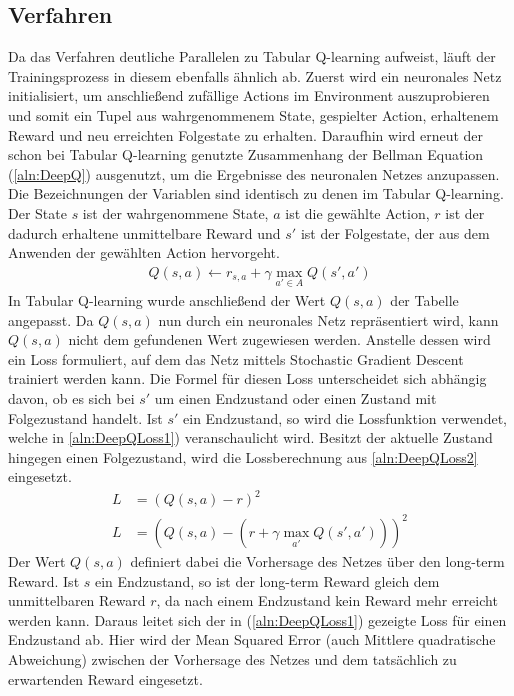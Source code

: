 \documentclass[11pt]{scrartcl}
\begin{document}
\subsection{Verfahren}
\label{sec:deepq-procedure}
Da das Verfahren deutliche Parallelen zu Tabular Q-learning aufweist, läuft der
Trainingsprozess in diesem ebenfalls ähnlich ab. Zuerst wird ein neuronales Netz
initialisiert, um anschließend zufällige Actions im Environment auszuprobieren
und somit ein Tupel aus wahrgenommenem State, gespielter Action, erhaltenem
Reward und neu erreichten Folgestate zu erhalten. Daraufhin wird erneut der schon
bei Tabular Q-learning genutzte Zusammenhang der Bellman Equation (\ref{aln:DeepQ})
ausgenutzt, um die Ergebnisse des neuronalen Netzes anzupassen. Die Bezeichnungen
der Variablen sind identisch zu denen im Tabular Q-learning. Der State $s$ ist der
wahrgenommene State, $a$ ist die gewählte Action, $r$ ist der dadurch erhaltene
unmittelbare Reward und $s'$ ist der Folgestate, der aus dem Anwenden der gewählten
Action hervorgeht.
\begin{align}
  Q(s, a) \leftarrow r_{s,a} + \gamma \max_{a' \in A}Q(s', a') \label{aln:DeepQ}
\end{align}
\noindent
In Tabular Q-learning wurde anschließend der Wert $Q(s, a)$ der Tabelle angepasst. Da 
$Q(s, a)$ nun durch ein neuronales Netz repräsentiert wird, kann $Q(s, a)$ nicht dem
gefundenen Wert zugewiesen werden. Anstelle dessen wird ein Loss formuliert, auf dem
das Netz mittels Stochastic Gradient Descent trainiert werden kann. Die Formel für
diesen Loss unterscheidet sich abhängig davon, ob es sich bei $s'$ um einen Endzustand
oder einen Zustand mit Folgezustand handelt. Ist $s'$ ein Endzustand, so wird die
Lossfunktion verwendet, welche in \autoref{aln:DeepQLoss1}) veranschaulicht wird.
Besitzt der aktuelle Zustand hingegen einen Folgezustand, wird die Lossberechnung
aus \autoref{aln:DeepQLoss2} eingesetzt.
\begin{align}
  L & = \left(Q(s, a) - r\right)^2 \label{aln:DeepQLoss1} \\
  L & = \left(Q(s, a) - \left(r + \gamma \max_{a'} Q(s', a')\right)\right)^2 \label{aln:DeepQLoss2}
\end{align}
\noindent
Der Wert $Q(s, a)$ definiert dabei die Vorhersage des Netzes über den long-term Reward.
Ist $s$ ein Endzustand, so ist der long-term Reward gleich dem unmittelbaren Reward $r$,
da nach einem Endzustand kein Reward mehr erreicht werden kann. Daraus leitet sich der in
(\ref{aln:DeepQLoss1}) gezeigte Loss für einen Endzustand ab. Hier wird der Mean Squared
Error (auch Mittlere quadratische Abweichung) zwischen der Vorhersage des Netzes und dem
tatsächlich zu erwartenden Reward eingesetzt.
\end{document}
